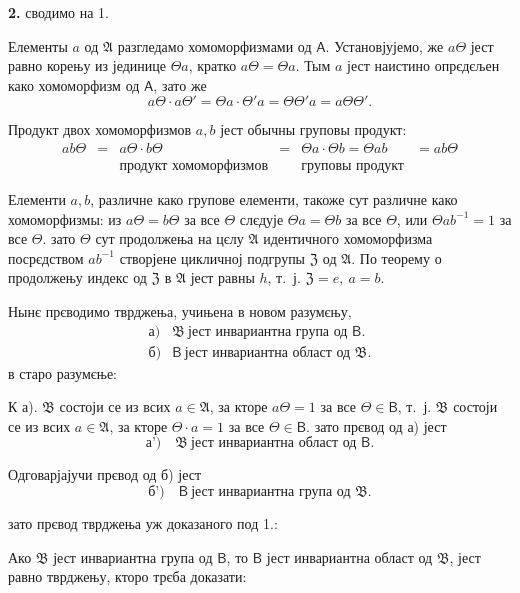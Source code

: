 \documentclass[11pt]{article}
\begin{document}
\textbf{2.} сводимо на 1.

Елементы \(a\) од \(\mathfrak A\) разгледамо хомоморфизмами од \(\mathsf A\). Установјујемо, же \(a\Theta\) јест равно корењу из јединице \(\Theta a\), кратко \(a\Theta=\Theta a\). Тым \(a\) јест наистино опрєдєљен како хомоморфизм од \(\mathsf A\), зато же
\[
a\Theta\cdot a\Theta'=\Theta a\cdot\Theta' a=\Theta\Theta' a=a\Theta\Theta'.
\]

Продукт двох хомоморфизмов \(a,b\) јест обычны груповы продукт:
\[
\begin{array}{cccccc}
ab\Theta&=&a\Theta\cdot b\Theta&=&\Theta a\cdot\Theta b=\Theta ab&=ab\Theta\\
&&\text{продукт хомоморфизмов}&&\text{груповы продукт}&
\end{array}
\]

Елементи \(a,b\), различне како групове елементи, такоже сут различне како хомоморфизмы: из \(a\Theta=b\Theta\) за все \(\Theta\) слєдује \(\Theta a=\Theta b\) за все \(\Theta\), или \(\Theta ab^{-1}=1\) за все \(\Theta\). зато \(\Theta\) сут продолжења на цєлу \(\mathfrak A\) идентичного хомоморфизма посрєдством \(ab^{-1}\) створјене цикличној подгрупы \(\mathfrak Z\) од \(\mathfrak A\). По теорему о продолжењу индекс од \(\mathfrak Z\) в \(\mathfrak A\) јест равны \(h\), т.~ј. \(\mathfrak Z=e,\ a=b\).

Нынє прєводимо тврджења, учињена в новом разумєњу,
\[
\begin{array}{ll}
\text{а)}& \mathfrak B\ \text{јест инвариантна група од }\mathsf B.\\
\text{б)}& \mathsf B\ \text{јест инвариантна област од }\mathfrak B.
\end{array}
\]
в старо разумєње:

К а). \(\mathfrak B\) состоји се из всих \(a\in\mathfrak A\), за кторе \(a\Theta=1\) за все \(\Theta\in\mathsf B\), т.~ј. \(\mathfrak B\) состоји се из всих \(a\in\mathfrak A\), за кторе \(\Theta\cdot a=1\) за все \(\Theta\in\mathsf B\). зато прєвод од а) јест
\[
\text{а')} \quad \mathfrak B\ \text{јест инвариантна област од }\mathsf B.
\]

Одговарјајучи прєвод од б) јест
\[
\text{б')} \quad \mathsf B\ \text{јест инвариантна група од }\mathfrak B.
\]

зато прєвод тврджења уж доказаного под 1.:

Ако \(\mathfrak B\) јест инвариантна група од \(\mathsf B\), то \(\mathsf B\) јест инвариантна област од \(\mathfrak B\),
јест равно тврджењу, кторо трєба доказати:
\end{document}
